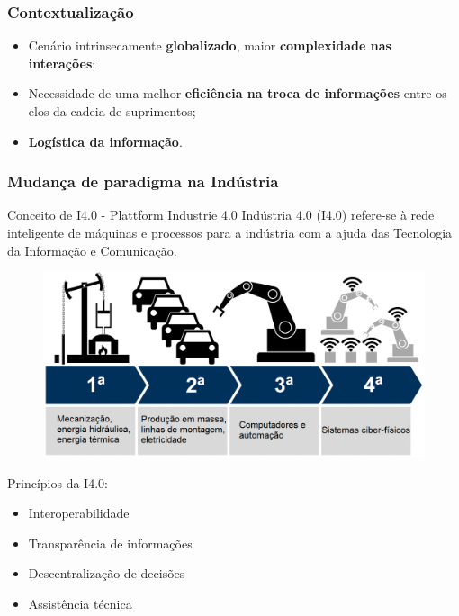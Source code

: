 \documentclass[10pt]{beamer}
\begin{document}
\begin{frame}
	\frametitle{Contextualização}
		
	\begin{itemize}
		\item Cenário intrinsecamente \textbf{globalizado}, maior \textbf{complexidade nas interações};
		\item Necessidade de uma melhor\textbf{ eficiência na troca de informações} entre os elos da cadeia de suprimentos;
		\item \textbf{Logística da informação}.
	\end{itemize}

\end{frame}
\begin{frame}
	\frametitle{Mudança de paradigma na Indústria}
	
	\begin{block}{Conceito de I4.0 - Plattform Industrie 4.0 }
		Indústria 4.0 (I4.0) refere-se à rede inteligente de máquinas e processos para a indústria com a ajuda das Tecnologia da Informação e Comunicação.
	\end{block}

	\bigskip
	\begin{minipage}{.7\linewidth}
		\begin{figure}[htb]
			\centering
			\label{fig:i4}
			\includegraphics[width=1\textwidth]{i4.png}
		\end{figure}
	\end{minipage}%
	\begin{minipage}{.3\linewidth}
		{\scriptsize Princípios da I4.0:
		\begin{itemize}
			\item Interoperabilidade
			\item Transparência de informações
			\item Descentralização de decisões
			\item Assistência técnica
		\end{itemize}}
	\end{minipage}	
	
\end{frame}
\end{document}
